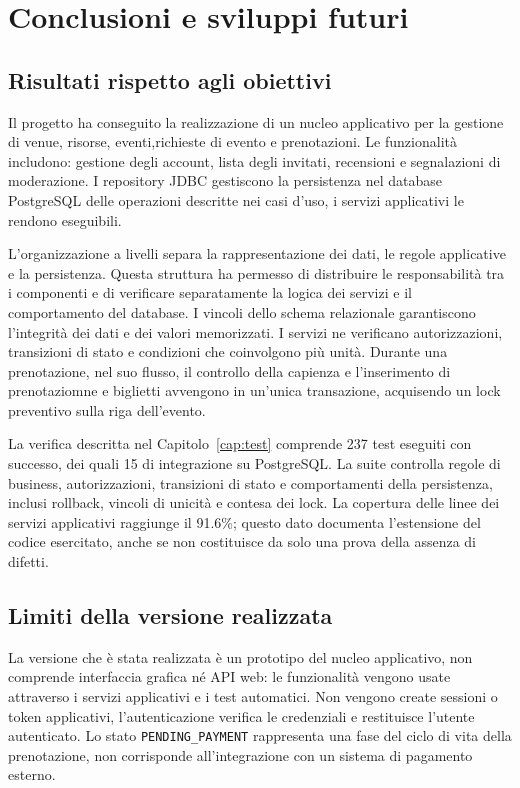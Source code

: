 \chapter{Conclusioni e sviluppi futuri}
\label{cap:conclusioni}

\section{Risultati rispetto agli obiettivi}
\label{sec:risultati-obiettivi}

Il progetto ha conseguito la realizzazione di un nucleo applicativo per la gestione di venue, risorse, eventi,richieste di evento e prenotazioni. Le funzionalità includono: gestione degli account, lista degli invitati, recensioni e segnalazioni di moderazione. I repository JDBC gestiscono la persistenza nel database PostgreSQL delle operazioni descritte nei casi d'uso, i servizi applicativi le rendono eseguibili.

L'organizzazione a livelli separa la rappresentazione dei dati, le regole applicative e la persistenza. Questa struttura ha permesso di distribuire le responsabilità tra i componenti e di verificare separatamente la logica dei servizi e il comportamento del database. I vincoli dello schema relazionale garantiscono l'integrità dei dati e dei valori memorizzati. I servizi ne verificano autorizzazioni, transizioni di stato e condizioni che coinvolgono più unità. Durante una prenotazione, nel suo flusso, il controllo della capienza e l'inserimento di prenotaziomne e biglietti avvengono in un'unica transazione, acquisendo un lock preventivo sulla riga dell'evento.

La verifica descritta nel Capitolo~\ref{cap:test} comprende 237 test eseguiti con successo, dei quali 15 di integrazione su PostgreSQL. La suite controlla regole di business, autorizzazioni, transizioni di stato e comportamenti della persistenza, inclusi rollback, vincoli di unicità e contesa dei lock. La copertura delle linee dei servizi applicativi raggiunge il 91.6\%; questo dato documenta l'estensione del codice esercitato, anche se non costituisce da solo una prova della assenza di difetti.

\section{Limiti della versione realizzata}
\label{sec:limiti}

La versione che è stata realizzata è un prototipo del nucleo applicativo, non comprende interfaccia grafica né API web: le funzionalità vengono usate attraverso i servizi applicativi e i test automatici. Non vengono create sessioni o token applicativi, l'autenticazione verifica le credenziali e restituisce l'utente autenticato. Lo stato \texttt{PENDING\_PAYMENT} rappresenta una fase del ciclo di vita della prenotazione, non corrisponde all'integrazione con un sistema di pagamento esterno.

